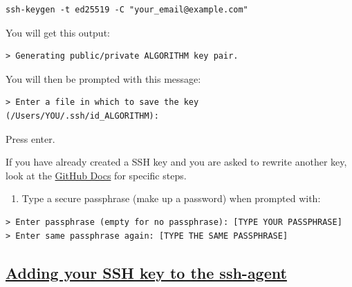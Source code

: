 \documentclass[
]{book}
\providecommand{\tightlist}{%
  \setlength{\itemsep}{0pt}\setlength{\parskip}{0pt}}
\theoremstyle{definition}
\theoremstyle{definition}
\theoremstyle{definition}
\theoremstyle{definition}
\theoremstyle{remark}
\begin{document}
\begin{verbatim}
ssh-keygen -t ed25519 -C "your_email@example.com"
\end{verbatim}

You will get this output:

\begin{verbatim}
> Generating public/private ALGORITHM key pair.
\end{verbatim}

You will then be prompted with this message:

\begin{verbatim}
> Enter a file in which to save the key (/Users/YOU/.ssh/id_ALGORITHM):
\end{verbatim}

Press enter.

If you have already created a SSH key and you are asked to rewrite another key, look at the \href{https://docs.github.com/en/authentication/connecting-to-github-with-ssh/generating-a-new-ssh-key-and-adding-it-to-the-ssh-agent\#generating-a-new-ssh-key:~:text=Please\%20note\%20that\%20if\%20you\%20created\%20SSH\%20keys\%20previously\%2C\%20ssh\%2Dkeygen\%20may\%20ask\%20you\%20to\%20rewrite\%20another\%20key\%2C\%20in\%20which\%20case\%20we\%20recommend\%20creating\%20a\%20custom\%2Dnamed\%20SSH\%20key.\%20To\%20do\%20so\%2C\%20type\%20the\%20default\%20file\%20location\%20and\%20replace\%20id_ALGORITHM\%20with\%20your\%20custom\%20key\%20name.}{GitHub Docs} for specific steps.

\begin{enumerate}
\def\labelenumi{\arabic{enumi}.}
\setcounter{enumi}{2}
\tightlist
\item
  Type a secure passphrase (make up a password) when prompted with:
\end{enumerate}

\begin{verbatim}
> Enter passphrase (empty for no passphrase): [TYPE YOUR PASSPHRASE]
> Enter same passphrase again: [TYPE THE SAME PASSPHRASE]
\end{verbatim}

\subsection{\texorpdfstring{\href{https://docs.github.com/en/authentication/connecting-to-github-with-ssh/generating-a-new-ssh-key-and-adding-it-to-the-ssh-agent\#adding-your-ssh-key-to-the-ssh-agent}{Adding your SSH key to the ssh-agent}}{Adding your SSH key to the ssh-agent}}\label{adding-your-ssh-key-to-the-ssh-agent}
\end{document}
